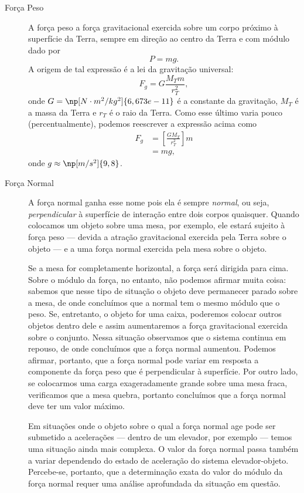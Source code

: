 \begin{description}
	\item[Força Peso] A força peso a força gravitacional exercida sobre um corpo próximo à superfície da Terra, sempre em direção ao centro da Terra e com módulo dado por
	\begin{equation}
		P = mg.
	\end{equation}
	A origem de tal expressão é a lei da gravitação universal:
	\begin{equation}
		F_g = G \frac{M_T m}{r_T^2},
	\end{equation}
	onde $G = \np[N\cdot m^2/kg^2]{6,673e-11}$ é a constante da gravitação, $M_T$ é a massa da Terra e $r_T$ é o raio da Terra. Como esse último varia pouco (percentualmente), podemos reescrever a expressão acima como
	\begin{align}
		F_g &= \left[\frac{G M_T}{r_T^2}\right] m \\
			&= mg,
	\end{align}
	onde $g \approx \np[m/s^2]{9,8}$.

\item[Força Normal] A força normal ganha esse nome pois ela é sempre \emph{normal}, ou seja, \emph{perpendicular} à superfície de interação entre dois corpos quaisquer. Quando colocamos um objeto sobre uma mesa, por exemplo, ele estará sujeito à força peso --- devida a atração gravitacional exercida pela Terra sobre o objeto --- e a uma força normal exercida pela mesa sobre o objeto.
	
	Se a mesa for completamente horizontal, a força será dirigida para cima. Sobre o módulo da força, no entanto, não podemos afirmar muita coisa: sabemos que nesse tipo de situação o objeto deve permanecer parado sobre a mesa, de onde concluímos que a normal tem o mesmo módulo que o peso. Se, entretanto, o objeto for uma caixa, poderemos colocar outros objetos dentro dele e assim aumentaremos a força gravitacional exercida sobre o conjunto. Nessa situação observamos que o sistema continua em repouso, de onde concluímos que a força normal aumentou. Podemos afirmar, portanto, que a força normal pode variar em resposta a componente da força peso que é perpendicular à superfície. Por outro lado, se colocarmos uma carga exageradamente grande sobre uma mesa fraca, verificamos que a mesa quebra, portanto concluímos que a força normal deve ter um valor máximo.

	Em situações onde o objeto sobre o qual a força normal age pode ser submetido a acelerações --- dentro de um elevador, por exemplo --- temos uma situação ainda mais complexa. O valor da força normal passa também a variar dependendo do estado de aceleração do sistema elevador-objeto. Percebe-se, portanto, que a determinação exata do valor do módulo da força normal requer uma análise aprofundada da situação em questão.


\end{description}
